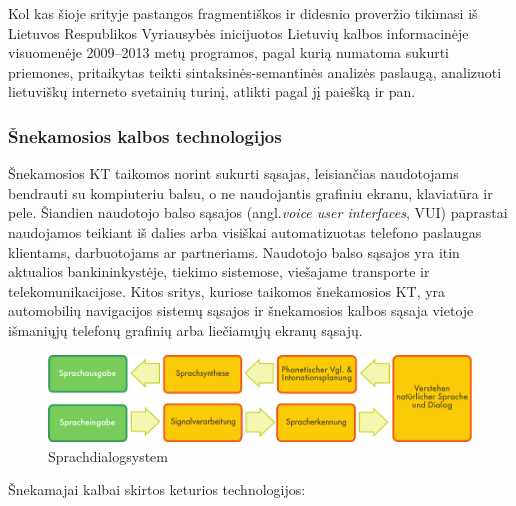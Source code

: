 \documentclass[]{../metanetpaper}
\begin{document}
\begin{multicols}{2}
    Kol kas šioje srityje pastangos fragmentiškos ir didesnio proveržio tikimasi iš Lietuvos Respublikos Vyriausybės inicijuotos Lietuvių kalbos informacinėje visuomenėje 2009–2013 metų programos, pagal kurią numatoma sukurti priemones, pritaikytas teikti sintaksinės-semantinės analizės paslaugą, analizuoti lietuviškų interneto svetainių turinį, atlikti pagal jį paiešką ir pan.
  
\subsubsection{Šnekamosios kalbos technologijos}

Šnekamosios KT taikomos norint sukurti sąsajas, leisiančias naudotojams bendrauti su kompiuteriu balsu, o ne naudojantis grafiniu ekranu, klaviatūra ir pele. Šiandien naudotojo balso sąsajos (angl.\textit{voice user interfaces}, VUI) paprastai naudojamos teikiant iš dalies arba visiškai automatizuotas telefono paslaugas klientams, darbuotojams ar partneriams. Naudotojo balso sąsajos yra itin aktualios bankininkystėje, tiekimo sistemose, viešajame transporte ir telekomunikacijose. Kitos sritys, kuriose taikomos šnekamosios KT, yra automobilių navigacijos sistemų sąsajos ir šnekamosios kalbos sąsaja vietoje išmaniųjų telefonų grafinių arba liečiamųjų ekranų sąsajų.


\begin{figure}[htb]
  \center 
  \includegraphics[width=\textwidth]{../_media/german/simple_speech-based_dialogue_architecture}
  \caption{Sprachdialogsystem}
  \label{fig:dialoguearch_de}
\end{figure}

Šnekamajai kalbai skirtos keturios technologijos:


\end{multicols}
\end{document}
